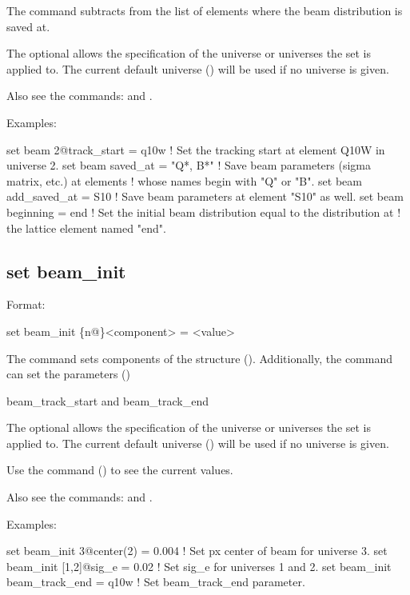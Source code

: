 {{The  command subtracts from the list of elements where the beam distribution is 
saved at. 

The optional  allows the specification of the universe or universes the set is applied
to. The current default universe () will be used if no universe is given. 

Also see the commands:  and .

Examples:
\begin{example}
  set beam 2@track_start = q10w  ! Set the tracking start at element Q10W in universe 2.
  set beam saved_at = "Q*, B*"   ! Save beam parameters (sigma matrix, etc.) at elements
                                 !  whose names begin with "Q" or "B".
  set beam add_saved_at = S10    ! Save beam parameters at element "S10" as well.
  set beam beginning = end       ! Set the initial beam distribution equal to the distribution at
                                 !  the lattice element named "end".
\end{example}


\subsection{set beam_init}
\label{s:set.beam.init}

Format:
\begin{example}
  set beam_init \{n@\}<component> = <value>
\end{example}

The  command sets components of the  structure ().
Additionally, the  command can set the parameters ()
\begin{example}
  beam_track_start  and
  beam_track_end
\end{example}

The optional  allows the specification of the universe or universes the set is applied
to. The current default universe () will be used if no universe is given. 

Use the  command () to see the current values.

Also see the commands:  and .

Examples:
\begin{example}
  set beam_init 3@center(2) = 0.004   ! Set px center of beam for universe 3.
  set beam_init [1,2]@sig_e = 0.02    ! Set sig_e for universes 1 and 2.
  set beam_init beam_track_end = q10w ! Set beam_track_end parameter.
\end{example}

}}
